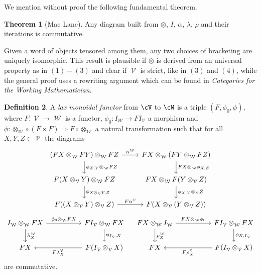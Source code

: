 \documentclass[a4paper,11pt,oneside,openany]{scrbook}
\DeclareMathOperator{\V}{\mathcal{V}}
\DeclareMathOperator{\W}{\mathcal{W}}
\theoremstyle{definition}
\newtheorem{thm}{Theorem}[section] %
\theoremstyle{definition}
\newtheorem{defn}[thm]{Definition} %
\begin{document}
We mention without proof the following fundamental theorem.

\begin{thm}[Mac Lane]
    Any diagram built from $\otimes$, $I$, $\alpha$, $\lambda$, $\rho$ and their iterations is commutative.
\end{thm}

    Given a word of objects tensored among them, any two choices of bracketing are uniquely isomorphic. This result is plausible if $\otimes$ is derived from an universal property as in $(1)-(3)$ and clear if $\V$ is strict, like in $(3)$ and $(4)$, while the general proof uses a rewriting argument which can be found in \textit{Categories for the Working Mathematician}.
    
\begin{defn}
    A \emph{lax monoidal functor} from $\cV$ to $\cW$ is a triple $(F,\phi_0,\phi)$, where $F\colon\V\rightarrow\W$ is a functor, $\phi_0\colon I_{\W}\rightarrow FI_{\V}$ a morphism and $\phi\colon\otimes_{\W}\circ(F\times F)\Rightarrow F\circ\otimes_{\W}$ a natural transformation such that for all $X,Y,Z\in\V$ the diagrams
    \[
    \begin{tikzcd}
        (FX\otimes_{\W}FY)\otimes_{\W}FZ\ar[r, "\alpha^{\W}"]\ar[d, "\phi_{X,Y}\otimes_{\W}FZ"]
        & FX\otimes_{\W}(FY\otimes_{\W}FZ)\ar[d, "FX\otimes_{\W}\phi_{X,Z}"] \\
        F(X\otimes_{\V}Y)\otimes_{\W}FZ\ar[d, "\phi_{X\otimes_{\V}Y,Z}"]
        & FX\otimes_{\W}F(Y\otimes_{\V}Z)\ar[d, "\phi_{X,Y}\otimes_{\V}Z"] \\
        F((X\otimes_{\V}Y)\otimes_{\V}Z)\ar[r, "F\alpha^{\V}"]
        & F(X\otimes_{\V}(Y\otimes_{\V}Z))
    \end{tikzcd}
    \]
    \[
    \begin{tikzcd}[column sep=5.0em]
        I_{\W}\otimes_{\W}FX\ar[r, "\phi_0\otimes_{\W}FX"]\ar[d, "\lambda_X^{\W}"]
        & FI_{\V}\otimes_{\W}FX\ar[d, "\phi_{I_{\V},X}"] \\
        FX
        & F(I_{\V}\otimes_{\V}X)\ar[l, "F\lambda_X^{\V}"]
    \end{tikzcd}
    \quad
    \begin{tikzcd}[column sep=5.0em]
        FX\otimes_{\W}I_{\W}\ar[r, "FX\otimes_{\W}\phi_0"]\ar[d, "\rho_X^{\W}"]
        & FI_{\V}\otimes_{\W}FX\ar[d, "\phi_{X,I_{\V}}"] \\
        FX
        & F(I_{\V}\otimes_{\V}X)\ar[l, "F\rho_X^{\V}"]
    \end{tikzcd}
    \]
    are commutative.
    

\end{defn}
\end{document}
